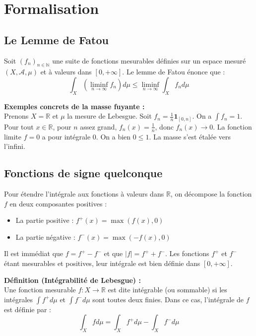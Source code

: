 \documentclass[11pt,a4paper]{article}
\begin{document}
\section{Formalisation}

\subsection{Le Lemme de Fatou}

Soit $(f_n)_{n \in \mathbb{N}}$ une suite de fonctions mesurables définies sur un espace mesuré $(X, \mathcal{A}, \mu)$ et à valeurs dans $[0, +\infty]$. Le lemme de Fatou énonce que :
\begin{equation}
\int_X \left( \liminf_{n \to \infty} f_n \right) d\mu \le \liminf_{n \to \infty} \int_X f_n d\mu
\end{equation}

\textbf{Exemples concrets de la masse fuyante :}\\
Prenons $X = \mathbb{R}$ et $\mu$ la mesure de Lebesgue.
Soit $f_n = \frac{1}{n} \mathbf{1}_{[0, n]}$. On a $\int f_n = 1$. Pour tout $x \in \mathbb{R}$, pour $n$ assez grand, $f_n(x) = \frac{1}{n}$, donc $f_n(x) \to 0$. La fonction limite $f = 0$ a pour intégrale 0. On a bien $0 \le 1$. La masse s'est étalée vers l'infini.

\subsection{Fonctions de signe quelconque}

Pour étendre l'intégrale aux fonctions à valeurs dans $\mathbb{R}$, on décompose la fonction $f$ en deux composantes positives :
\begin{itemize}
    \item La partie positive : $f^+(x) = \max(f(x), 0)$
    \item La partie négative : $f^-(x) = \max(-f(x), 0)$
\end{itemize}
Il est immédiat que $f = f^+ - f^-$ et que $|f| = f^+ + f^-$. Les fonctions $f^+$ et $f^-$ étant mesurables et positives, leur intégrale est bien définie dans $[0, +\infty]$.

\textbf{Définition (Intégrabilité de Lebesgue) :}\\
Une fonction mesurable $f : X \to \mathbb{R}$ est dite intégrable (ou sommable) si les intégrales $\int f^+ d\mu$ et $\int f^- d\mu$ sont toutes deux finies.
Dans ce cas, l'intégrale de $f$ est définie par :
\begin{equation}
\int_X f d\mu = \int_X f^+ d\mu - \int_X f^- d\mu
\end{equation}
\end{document}

